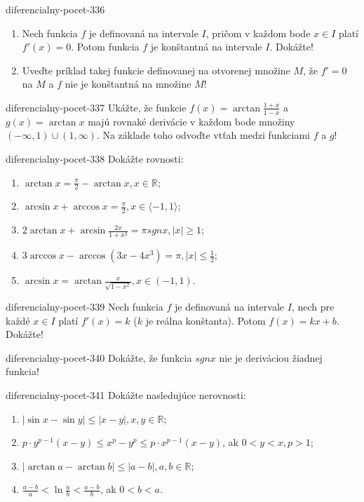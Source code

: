 \begin{defproblem}{diferencialny-pocet-336}
\begin{enumerate}
\item Nech funkcia $f$ je definovaná na intervale $I$, pričom v každom bode $x\in I$ platí $f'(x)=0$. Potom funkcia $f$ je konštantná na intervale $I$. Dokážte!
\item Uveďte príklad takej funkcie definovanej na otvorenej množine $M$, že $f'=0$ na $M$ a $f$ nie je konštantná na množine $M$!
\end{enumerate}
\end{defproblem}

\begin{defproblem}{diferencialny-pocet-337}
Ukážte, že funkcie $f(x)=\arctan \frac{1+x}{1-x}$ a $g(x)=\arctan x$ majú rovnaké derivácie v každom bode množiny $(-\infty,1)\cup (1,\infty)$. Na základe toho odvoďte vtťah medzi funkciami $f$ a $g$!
\end{defproblem}

\begin{defproblem}{diferencialny-pocet-338}
Dokážte rovnosti:
\begin{enumerate}
\item $\arctan x=\frac{\pi}{2}-\arctan x,x\in\mathbb{R}$;
\item $\arcsin x+\arccos x=\frac{\pi}{2},x\in\langle -1,1 \rangle$;
\item $2\arctan x+\arcsin \frac{2x}{1+x^2}=\pi sgn x,|x|\geq 1$;
\item $3\arccos x-\arccos (3x-4x^3)=\pi ,|x|\leq \frac{1}{2}$;
\item $\arcsin x=\arctan \frac{x}{\sqrt{1-x^2}},x\in (-1,1)$.
\end{enumerate}
\end{defproblem}

\begin{defproblem}{diferencialny-pocet-339}
Nech funkcia $f$ je definovaná na intervale $I$, nech pre každé $x\in I$ platí $f'(x)=k$ ($k$ je reálna konštanta). Potom $f(x)=kx+b$. Dokážte!
\end{defproblem}

\begin{defproblem}{diferencialny-pocet-340}
Dokážte, že funkcia $sgn x$ nie je deriváciou žiadnej funkcia!
\end{defproblem}

\begin{defproblem}{diferencialny-pocet-341}
Dokážte nasledujúce nerovnosti:
\begin{enumerate}
\item $|\sin x-\sin y|\leq |x-y|,x,y\in\mathbb{R}$;
\item $p\cdot y^{p-1}(x-y)\leq x^p-y^p \leq p\cdot x^{p-1}(x-y)$, ak $0<y<x,p>1$;
\item $|\arctan a-\arctan b|\leq |a-b|,a,b\in\mathbb{R}$;
\item $\frac{a-b}{a}<\ln \frac{a}{b}<\frac{a-b}{b}$, ak $0<b<a$.
\end{enumerate}
\end{defproblem}

